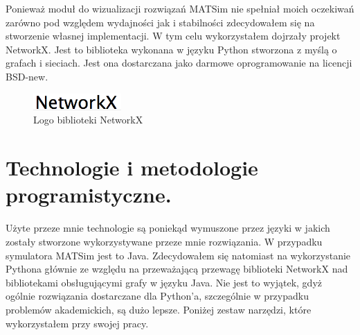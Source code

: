 \documentclass[twoside,12pt]{report}
\begin{document}
Ponieważ moduł do wizualizacji rozwiązań MATSim nie spełniał moich oczekiwań zarówno pod względem wydajności jak i stabilności zdecydowałem się na stworzenie własnej implementacji. W tym celu wykorzystałem dojrzały projekt NetworkX. Jest to biblioteka wykonana w języku Python stworzona z myślą o grafach i sieciach. Jest ona dostarczana jako darmowe oprogramowanie na licencji BSD-new. 

\begin{figure}[ht]
\centering
\includegraphics[width=0.30\textwidth]{img/networkx}
\caption{Logo biblioteki NetworkX\cite{networkx}} 
\end{figure}

\section{Technologie i metodologie programistyczne.}

Użyte przeze mnie technologie są poniekąd wymuszone przez języki w jakich zostały stworzone wykorzystywane przeze mnie rozwiązania. W przypadku symulatora MATSim jest to Java. Zdecydowałem się natomiast na wykorzystanie Pythona głównie ze względu na przeważającą przewagę biblioteki NetworkX nad bibliotekami obsługującymi grafy w języku Java. Nie jest to wyjątek, gdyż ogólnie rozwiązania dostarczane dla Python'a, szczególnie w przypadku problemów akademickich, są dużo lepsze. Poniżej zestaw narzędzi, które wykorzystałem przy swojej pracy.  
\end{document}
